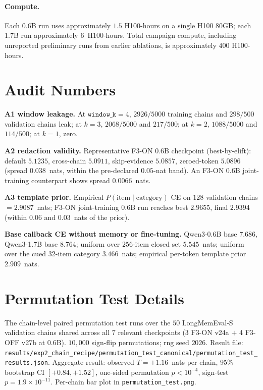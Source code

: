 \documentclass{article}
\begin{document}
\paragraph{Compute.}  Each 0.6B run uses approximately $1.5$
H100-hours on a single H100 80GB; each 1.7B run approximately
$6$~H100-hours.  Total campaign compute, including unreported
preliminary runs from earlier ablations, is approximately $400$
H100-hours.

\section{Audit Numbers}
\label{app:audits}

\textbf{A1 window leakage.}  At $\texttt{window\_k}=4$,
$2926/5000$ training chains and $298/500$ validation chains leak;
at $k=3$, $2068/5000$ and $217/500$; at $k=2$, $1088/5000$ and
$114/500$; at $k=1$, zero.

\textbf{A2 redaction validity.}  Representative F3-ON 0.6B
checkpoint (best-by-elift): default $5.1235$, cross-chain $5.0911$,
skip-evidence $5.0857$, zeroed-token $5.0896$ (spread $0.038$~nats,
within the pre-declared $0.05$-nat band).  An F3-ON 0.6B
joint-training counterpart shows spread $0.0066$~nats.

\textbf{A3 template prior.}  Empirical
$P(\text{item}\mid\text{category})$ CE on $128$ validation chains
$=2.9087$~nats; F3-ON joint-training 0.6B run reaches best
$2.9655$, final $2.9394$ (within $0.06$ and $0.03$~nats of the
prior).

\textbf{Base callback CE without memory or fine-tuning.}
Qwen3-0.6B base $7.686$, Qwen3-1.7B base $8.764$; uniform over
$256$-item closed set $5.545$~nats; uniform over the cued $32$-item
category $3.466$~nats; empirical per-token template prior
$2.909$~nats.

\section{Permutation Test Details}
\label{app:perm}

The chain-level paired permutation test runs over the $50$
LongMemEval-S validation chains shared across all $7$ relevant
checkpoints (3 F3-ON v24a $+$ 4 F3-OFF v27b at 0.6B).  $10{,}000$
sign-flip permutations; rng seed $2026$.  Result file:
\texttt{results/exp2\_chain\_recipe/permutation\_test\_canonical/permutation\_test\_results.json}.
Aggregate result: observed $T = +1.16$~nats per chain, 95\%
bootstrap CI $[+0.84, +1.52]$, one-sided permutation
$p < 10^{-4}$, sign-test $p = 1.9\times 10^{-11}$.  Per-chain bar
plot in \texttt{permutation\_test.png}.
\end{document}

